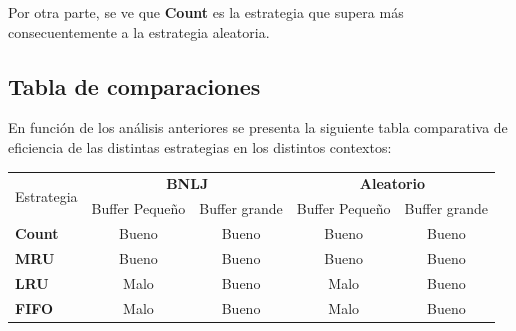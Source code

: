 Por otra parte, se ve que \textbf{Count} es la estrategia que supera m\'as consecuentemente a la estrategia aleatoria. 

\subsection{Tabla de comparaciones}
En funci\'on de los an\'alisis anteriores se presenta la siguiente tabla comparativa de eficiencia de las distintas estrategias en los distintos contextos:
\begin{center}
  \begin{tabular}{ | l | c | c | c | c | }
    \hline
    \multirow{2}{*}{Estrategia} & \multicolumn{2}{c|}{\textbf{BNLJ}} & \multicolumn{2}{c|}{\textbf{Aleatorio}} \\
    & Buffer Peque\~no & Buffer grande & Buffer Peque\~no & Buffer grande \\ \hline
    \textbf{Count} & Bueno & Bueno & Bueno & Bueno \\ \hline
    \textbf{MRU} & Bueno & Bueno & Bueno & Bueno \\ \hline
    \textbf{LRU} & Malo & Bueno & Malo & Bueno \\ \hline
    \textbf{FIFO} & Malo & Bueno & Malo & Bueno \\ \hline
  \end{tabular}
\end{center}

